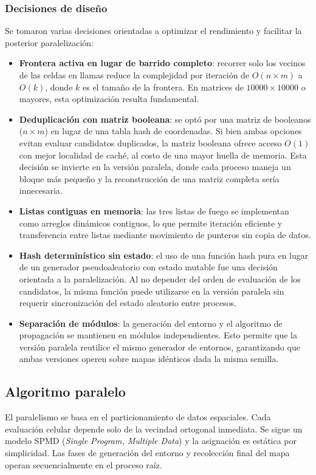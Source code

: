 \documentclass[10pt,a4paper]{article}
\begin{document}
\subsubsection{Decisiones de diseño}

Se tomaron varias decisiones orientadas a optimizar el rendimiento y facilitar la posterior paralelización:

\begin{itemize}
    \item \textbf{Frontera activa en lugar de barrido completo}: recorrer solo los vecinos de las celdas en llamas reduce la complejidad por iteración de $O(n \times m)$ a $O(k)$, donde $k$ es el tamaño de la frontera. En matrices de $10000 \times 10000$ o mayores, esta optimización resulta fundamental.
    \item \textbf{Deduplicación con matriz booleana}: se optó por una matriz de booleanos ($n \times m$) en lugar de una tabla hash de coordenadas. Si bien ambas opciones evitan evaluar candidatos duplicados, la matriz booleana ofrece acceso $O(1)$ con mejor localidad de caché, al costo de una mayor huella de memoria. Esta decisión se invierte en la versión paralela, donde cada proceso maneja un bloque más pequeño y la reconstrucción de una matriz completa sería innecesaria.
    \item \textbf{Listas contiguas en memoria}: las tres listas de fuego se implementan como arreglos dinámicos contiguos, lo que permite iteración eficiente y transferencia entre listas mediante movimiento de punteros sin copia de datos.
    \item \textbf{Hash determinístico sin estado}: el uso de una función hash pura en lugar de un generador pseudoaleatorio con estado mutable fue una decisión orientada a la paralelización. Al no depender del orden de evaluación de los candidatos, la misma función puede utilizarse en la versión paralela sin requerir sincronización del estado aleatorio entre procesos.
    \item \textbf{Separación de módulos}: la generación del entorno y el algoritmo de propagación se mantienen en módulos independientes. Esto permite que la versión paralela reutilice el mismo generador de entornos, garantizando que ambas versiones operen sobre mapas idénticos dada la misma semilla.
\end{itemize}

\subsection{Algoritmo paralelo}
El paralelismo se basa en el particionamiento de datos espaciales. Cada evaluación celular depende solo de la vecindad ortogonal inmediata. Se sigue un modelo SPMD (\textit{Single Program, Multiple Data}) y la asignación es estática por simplicidad. Las fases de generación del entorno y recolección final del mapa operan secuencialmente en el proceso raíz.
\end{document}
